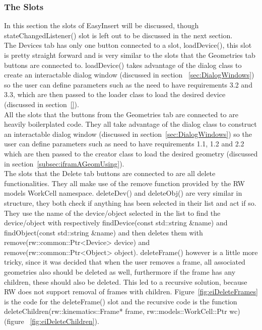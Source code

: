 \subsubsection{The Slots}
\label{sec:eiSlots}
In this section the slots of EasyInsert will be discussed, though stateChangedListener() slot is left out to be discussed in the next section.\\

The Devices tab has only one button connected to a slot, loadDevice(), this slot is pretty straight forward and is very similar to the slots that the Geometries tab buttons are connected to. loadDevice() takes advantage of the dialog class to create an interactable dialog window (discussed in section ~\ref{sec:DialogWindows}) so the user can define parameters such as the need to have requirements 3.2 and 3.3, which are then passed to the loader class to load the desired device (discussed in section~\ref{}).\\

All the slots that the buttons from the Geometries tab are connected to are heavily boilerplated code. They all take advantage of the dialog class to construct an interactable dialog window (discussed in section~\ref{sec:DialogWindows}) so the user can define parameters such as need to have requirements 1.1, 1.2 and 2.2 which are then passed to the creator class to load the desired geometry (discussed in section~\ref{subsec:iframAGeomUsing}).\\

The slots that the Delete tab buttons are connected to are all delete functionalities. They all make use of the remove function provided by the RW models WorkCell namespace. deleteDev() and deleteObj() are very similar in structure, they both check if anything has been selected in their list and act if so. They use the name of the device/object selected in the list to find the device/object with respectively findDevice(const std::string \&name) and findObject(const std::string \&name) and then deletes them with remove(rw::common::Ptr<Device> device) and remove(rw::common::Ptr<Object> object).
deleteFrame() however is a little more tricky, since it was decided that when the user removes a frame, all associated geometries also should be deleted as well, furthermore if the frame has any children, these should also be deleted. This led to a recursive solution, because RW does not support removal of frames with children. Figure~\ref{fig:eiDeleteFrames} is the code for the deleteFrame() slot and the recursive code is the function deleteChildren(rw::kinematics::Frame* frame, rw::models::WorkCell::Ptr wc) (figure ~\ref{fig:eiDeleteChildren}). 

